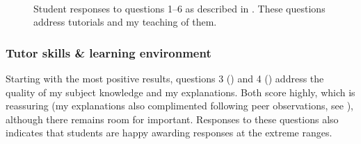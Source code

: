\begin{figure}
    \quad
    \\
\caption{Student responses to questions 1--6 as described in . These questions address tutorials and my teaching of them.}
  \label{fig:plot-A}
\end{figure}

\subsubsection{Tutor skills \& learning environment}\label{sec:tutor-plus}

Starting with the most positive results, questions 3 () and 4 () address the quality of my subject knowledge and my explanations. Both score highly, which is reassuring (my explanations also complimented following peer observations, see ), although there remains room for important. Responses to these questions also indicates that students are happy awarding responses at the extreme ranges.

